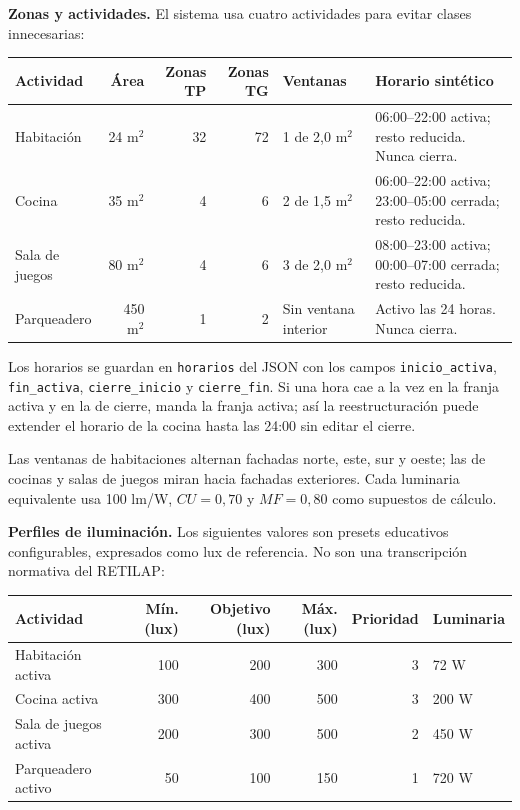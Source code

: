 \documentclass[12pt,a4paper]{article}
\newcommand{\codigo}[1]{\texttt{#1}}
\begin{document}
\textbf{Zonas y actividades.} El sistema usa cuatro actividades para evitar clases innecesarias:

\begin{center}\small
\begin{tabular}{p{}r r r p{}p{}}
\toprule
\textbf{Actividad} & \textbf{Área} & \textbf{Zonas TP} & \textbf{Zonas TG} & \textbf{Ventanas} & \textbf{Horario sintético}\\
\midrule
Habitación & 24 m$^2$ & 32 & 72 & 1 de 2,0 m$^2$ & 06:00--22:00 activa; resto reducida. Nunca cierra.\\
Cocina & 35 m$^2$ & 4 & 6 & 2 de 1,5 m$^2$ & 06:00--22:00 activa; 23:00--05:00 cerrada; resto reducida.\\
Sala de juegos & 80 m$^2$ & 4 & 6 & 3 de 2,0 m$^2$ & 08:00--23:00 activa; 00:00--07:00 cerrada; resto reducida.\\
Parqueadero & 450 m$^2$ & 1 & 2 & Sin ventana interior & Activo las 24 horas. Nunca cierra.\\
\bottomrule
\end{tabular}
\end{center}

Los horarios se guardan en \codigo{horarios} del JSON con los campos \codigo{inicio\_activa}, \codigo{fin\_activa}, \codigo{cierre\_inicio} y \codigo{cierre\_fin}. Si una hora cae a la vez en la franja activa y en la de cierre, manda la franja activa; así la reestructuración puede extender el horario de la cocina hasta las 24:00 sin editar el cierre.

Las ventanas de habitaciones alternan fachadas norte, este, sur y oeste; las de cocinas y salas de juegos miran hacia fachadas exteriores. Cada luminaria equivalente usa 100 lm/W, $CU=0,70$ y $MF=0,80$ como supuestos de cálculo.

\textbf{Perfiles de iluminación.} Los siguientes valores son presets educativos configurables, expresados como lux de referencia. No son una transcripción normativa del RETILAP:

\begin{center}\small
\begin{tabular}{p{}r r r r p{}}
\toprule
\textbf{Actividad} & \textbf{Mín. (lux)} & \textbf{Objetivo (lux)} & \textbf{Máx. (lux)} & \textbf{Prioridad} & \textbf{Luminaria}\\
\midrule
Habitación activa & 100 & 200 & 300 & 3 & 72 W\\
Cocina activa & 300 & 400 & 500 & 3 & 200 W\\
Sala de juegos activa & 200 & 300 & 500 & 2 & 450 W\\
Parqueadero activo & 50 & 100 & 150 & 1 & 720 W\\
\bottomrule
\end{tabular}
\end{center}
\end{document}
